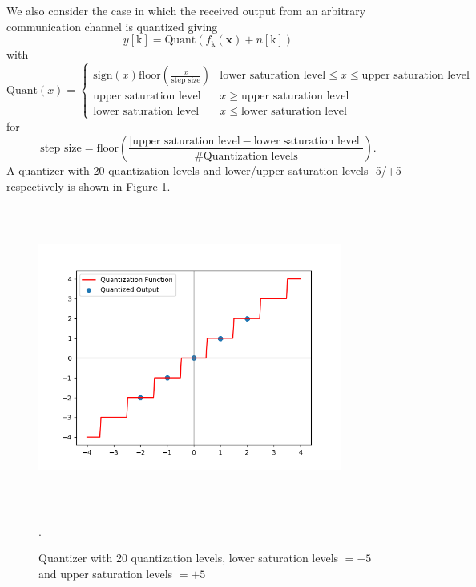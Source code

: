 \documentclass[12pt,a4paper]{report}
\begin{document}
\par 
We also consider the case in which the received output from an arbitrary communication channel is quantized giving
\begin{equation*}
y[\text{k}] = \text{Quant}(f_{\text{k}}(\mathbf{x}) + n[\text{k}])
\end{equation*}
 with
\[\text{Quant}(x) = 
\begin{cases}
\text{sign}(x)\text{floor}(\frac{x}{\text{step size}})& \text{lower saturation level} \leq x \leq \text{upper saturation level}\\
\text{upper saturation level} & x \geq \text{upper saturation level}\\
\text{lower saturation level} & x \leq \text{lower saturation level}
\end{cases}
\]
 for 
 \begin{equation*}
  \text{step size} =\text{floor}\left(\frac{|\text{upper saturation level}- \text{lower saturation level}|}{\text{\# Quantization levels}}\right).
 \end{equation*} A quantizer with 20 quantization levels and lower/upper saturation levels -5/+5 respectively is shown in Figure \ref{fig:Quantized Overlay}.
 
 \begin{figure}[H]
\centering
	\includegraphics[width=10cm,height = 10cm]{system_model/quantizer_overlay}
			  \caption{Quantizer with 20 quantization levels, lower saturation levels  $= -5$ and upper saturation levels  $= +5$}.
	  \label{fig:Quantized Overlay}
\end{figure}
 
\end{document}
